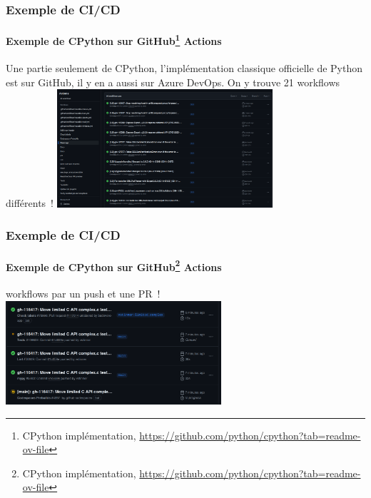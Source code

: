 \documentclass{beamer}
\begin{document}
    \begin{frame}
        \frametitle{Exemple de CI/CD}
        \framesubtitle{Exemple de CPython sur GitHub{\footnote{CPython implémentation, \url{https://github.com/python/cpython?tab=readme-ov-file}}} Actions}
        \transdissolve
        Une partie seulement de CPython, l'implémentation classique officielle de Python est sur GitHub, il y en a aussi sur Azure DevOps.
        On y trouve 21 workflows différents~!
        \bigbreak
        \centering
        \includegraphics[width=8cm]{image/cpython-github-workflows.png}
    \end{frame}

    \begin{frame}
        \frametitle{Exemple de CI/CD}
        \framesubtitle{Exemple de CPython sur GitHub{\footnote{CPython implémentation, \url{https://github.com/python/cpython?tab=readme-ov-file}}} Actions}
         workflows  par un push et une PR~!
        \bigbreak
        \centering
        \includegraphics[width=8cm]{image/cpython-actions-triggered.png}
    \end{frame}
\end{document}
